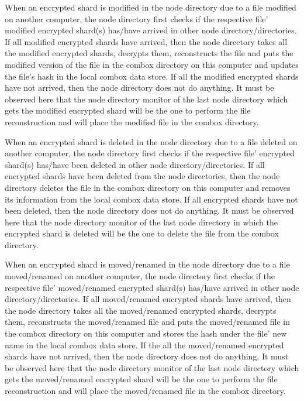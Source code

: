 When an encrypted shard is modified in the node directory due to a
file modified on another computer, the node directory first checks if
the respective file' modified encrypted shard(s) has/have arrived in
other node directory/directories. If all modified encrypted shards
have arrived, then the node directory takes all the modified encrypted
shards, decrypts them, reconstructs the file and puts the modified
version of the file in the combox directory on this computer and
updates the file's hash in the local combox data store. If all the
modified encrypted shards have not arrived, then the node directory
does not do anything. It must be observed here that the node directory
monitor of the last node directory which gets the modified encrypted
shard will be the one to perform the file reconstruction and will
place the modified file in the combox directory.

When an encrypted shard is deleted in the node directory due to a file
deleted on another computer, the node directory first checks if the
respective file' encrypted shard(s) has/have been deleted in other
node directory/directories. If all encrypted shards have been deleted
from the node directories, then the node directory deletes the file in
the combox directory on this computer and removes its information from
the local combox data store. If all encrypted shards have not been
deleted, then the node directory does not do anything. It must be
observed here that the node directory monitor of the last node
directory in which the encrypted shard is deleted will be the one to
delete the file from the combox directory.

When an encrypted shard is moved/renamed in the node directory due to
a file moved/renamed on another computer, the node directory first
checks if the respective file' moved/renamed encrypted shard(s)
has/have arrived in other node directory/directories. If all
moved/renamed encrypted shards have arrived, then the node directory
takes all the moved/renamed encrypted shards, decrypts them,
reconstructs the moved/renamed file and puts the moved/renamed file in
the combox directory on this computer and stores the hash under the
file' new name in the local combox data store. If the all the
moved/renamed encrypted shards have not arrived, then the node
directory does not do anything. It must be observed here that the node
directory monitor of the last node directory which gets the
moved/renamed encrypted shard will be the one to perform the file
reconstruction and will place the moved/renamed file in the combox
directory.

